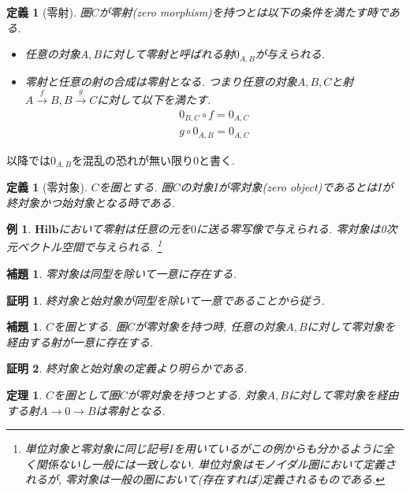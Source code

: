 \documentclass[a4paper,12pt]{ltjsarticle}
\theoremstyle{break}
\newtheorem{defn}[thm]{定義}
\newtheorem{eg}[thm]{例}
\newtheorem{thrm}[thm]{定理}
\newtheorem{lem}[thm]{補題}
\newtheorem*{prf}{証明}
\newcommand{\hilb}{\mathbf{Hilb}}
\newcommand{\xr}[1]{\xrightarrow{#1}}
\newcommand{\ci}{\circ}
\numberwithin{equation}{section}
\begin{document}
\begin{defn}[零射]
  圏$C$が零射(zero morphism)を持つとは以下の条件を満たす時である. 
  \begin{itemize}
    \item 任意の対象$A,B$に対して零射と呼ばれる射$0_{A,B}$が与えられる.
    \item 零射と任意の射の合成は零射となる. 
    つまり任意の対象$A,B,C$と射$A \xr{f} B, B \xr{g} C$に対して以下を満たす. 
    \begin{align*}
      0_{B,C} \ci f = 0_{A,C} \\
      g \ci 0_{A,B} = 0_{A,C}
    \end{align*}
  \end{itemize}
\end{defn}

以降では$0_{A,B}$を混乱の恐れが無い限り$0$と書く. 

\begin{defn}[零対象]
  $C$を圏とする. 
  圏$C$の対象$I$が零対象(zero object)であるとは$I$が終対象かつ始対象となる時である. 
\end{defn}

\begin{eg}
  $\hilb$において零射は任意の元を$0$に送る零写像で与えられる. 
  零対象は0次元ベクトル空間で与えられる. 
  \footnote{
    単位対象と零対象に同じ記号$I$を用いているがこの例からも分かるように全く関係ないし一般には一致しない. 
    単位対象はモノイダル圏において定義されるが, 零対象は一般の圏において(存在すれば)定義されるものである. 
  }
\end{eg}

\begin{lem}
  零対象は同型を除いて一意に存在する. 
\end{lem}

\begin{prf}
  終対象と始対象が同型を除いて一意であることから従う. 
\end{prf}

\begin{lem}
  $C$を圏とする. 
  圏$C$が零対象を持つ時, 任意の対象$A,B$に対して零対象を経由する射が一意に存在する. 
\end{lem}  

\begin{prf}
  終対象と始対象の定義より明らかである. 
\end{prf}

\begin{thrm}
  $C$を圏として圏$C$が零対象を持つとする. 
  対象$A,B$に対して零対象を経由する射$A \to 0 \to B$は零射となる. 
\end{thrm} 
\end{document}
